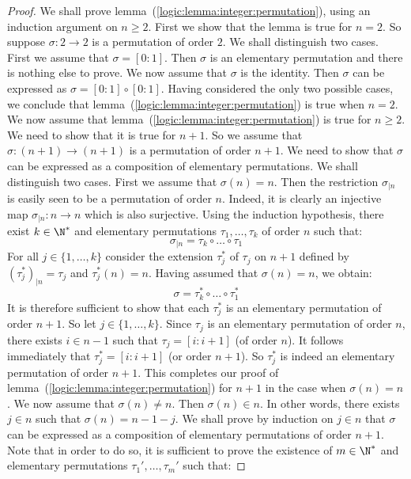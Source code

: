 \begin{proof}
We shall prove lemma~(\ref{logic:lemma:integer:permutation}), using
an induction argument on $n\geq 2$. First we show that the lemma is
true for $n=2$. So suppose $\sigma:2\to 2$ is a permutation of order
$2$. We shall distinguish two cases. First we assume that $\sigma =
[0\!:\!1]$. Then $\sigma$ is an elementary permutation and there is
nothing else to prove. We now assume that $\sigma$ is the identity.
Then $\sigma$ can be expressed as $\sigma =
[0\!:\!1]\circ[0\!:\!1]$. Having considered the only two possible
cases, we conclude that
lemma~(\ref{logic:lemma:integer:permutation}) is true when $n=2$. We
now assume that lemma~(\ref{logic:lemma:integer:permutation}) is
true for $n\geq 2$. We need to show that it is true for $n+1$. So we
assume that $\sigma: (n+1)\to(n+1)$ is a permutation of order $n+1$.
We need to show that $\sigma$ can be expressed as a composition of
elementary permutations. We shall distinguish two cases. First we
assume that $\sigma(n)=n$. Then the restriction $\sigma_{|n}$ is
easily seen to be a permutation of order $n$. Indeed, it is clearly
an injective map $\sigma_{|n}:n\to n$ which is also surjective.
Using the induction hypothesis, there exist $k\in\N^{*}$ and
elementary permutations $\tau_{1},\ldots,\tau_{k}$ of order $n$ such
that:
    \[
    \sigma_{|n}=\tau_{k}\circ\ldots\circ\tau_{1}
    \]
For all $j\in\{1,\ldots,k\}$ consider the extension $\tau^{*}_{j}$
of $\tau_{j}$ on $n+1$ defined by $(\tau^{*}_{j})_{|n}=\tau_{j}$ and
$\tau_{j}^{*}(n)=n$. Having assumed that $\sigma(n)=n$, we obtain:
     \[
    \sigma =\tau^{*}_{k}\circ\ldots\circ\tau^{*}_{1}
    \]
It is therefore sufficient to show that each $\tau^{*}_{j}$ is an
elementary permutation of order $n+1$. So let $j\in\{1,\ldots,k\}$.
Since $\tau_{j}$ is an elementary permutation of order $n$, there
exists $i\in n-1$ such that $\tau_{j}=[i:i+1]$ (of order $n$). It
follows immediately that $\tau^{*}_{j}=[i:i+1]$ (or order $n+1$). So
$\tau^{*}_{j}$ is indeed an elementary permutation of order $n+1$.
This completes our proof of
lemma~(\ref{logic:lemma:integer:permutation}) for $n+1$ in the case
when $\sigma(n)=n$. We now assume that $\sigma(n)\neq n$. Then
$\sigma(n)\in n$. In other words, there exists $j\in n$ such that
$\sigma(n)=n-1-j$. We shall prove by induction on $j\in n$ that
$\sigma$ can be expressed as a composition of elementary
permutations of order $n+1$. Note that in order to do so, it is
sufficient to prove the existence of $m\in\N^{*}$ and elementary
permutations $\tau_{1}',\ldots ,\tau_{m}'$ such that:

\end{proof}
